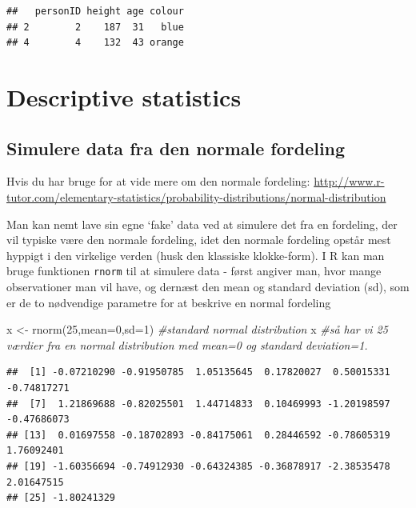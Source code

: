 \documentclass[
]{book}
\newenvironment{Shaded}{\begin{snugshade}}{\end{snugshade}}
\newcommand{\AttributeTok}[1]{\textcolor[rgb]{0.77,0.63,0.00}{#1}}
\newcommand{\CommentTok}[1]{\textcolor[rgb]{0.56,0.35,0.01}{\textit{#1}}}
\newcommand{\DecValTok}[1]{\textcolor[rgb]{0.00,0.00,0.81}{#1}}
\newcommand{\FunctionTok}[1]{\textcolor[rgb]{0.00,0.00,0.00}{#1}}
\newcommand{\NormalTok}[1]{#1}
\newcommand{\OtherTok}[1]{\textcolor[rgb]{0.56,0.35,0.01}{#1}}
\begin{document}
\begin{verbatim}
##   personID height age colour
## 2        2    187  31   blue
## 4        4    132  43 orange
\end{verbatim}

\hypertarget{descriptive-statistics}{%
\section{Descriptive statistics}\label{descriptive-statistics}}

\hypertarget{simulere-data-fra-den-normale-fordeling}{%
\subsection{Simulere data fra den normale fordeling}\label{simulere-data-fra-den-normale-fordeling}}

Hvis du har bruge for at vide mere om den normale fordeling: \url{http://www.r-tutor.com/elementary-statistics/probability-distributions/normal-distribution}

Man kan nemt lave sin egne `fake' data ved at simulere det fra en fordeling, der vil typiske være den normale fordeling, idet den normale fordeling opstår mest hyppigt i den virkelige verden (husk den klassiske klokke-form). I R kan man bruge funktionen \texttt{rnorm} til at simulere data - først angiver man, hvor mange observationer man vil have, og dernæst den mean og standard deviation (sd), som er de to nødvendige parametre for at beskrive en normal fordeling

\begin{Shaded}
\begin{Highlighting}[]
\NormalTok{x }\OtherTok{\textless{}{-}} \FunctionTok{rnorm}\NormalTok{(}\DecValTok{25}\NormalTok{,}\AttributeTok{mean=}\DecValTok{0}\NormalTok{,}\AttributeTok{sd=}\DecValTok{1}\NormalTok{) }\CommentTok{\#standard normal distribution}
\NormalTok{x }\CommentTok{\#så har vi 25 værdier fra en normal distribution med mean=0 og standard deviation=1.}
\end{Highlighting}
\end{Shaded}

\begin{verbatim}
##  [1] -0.07210290 -0.91950785  1.05135645  0.17820027  0.50015331 -0.74817271
##  [7]  1.21869688 -0.82025501  1.44714833  0.10469993 -1.20198597 -0.47686073
## [13]  0.01697558 -0.18702893 -0.84175061  0.28446592 -0.78605319  1.76092401
## [19] -1.60356694 -0.74912930 -0.64324385 -0.36878917 -2.38535478  2.01647515
## [25] -1.80241329
\end{verbatim}
\end{document}
